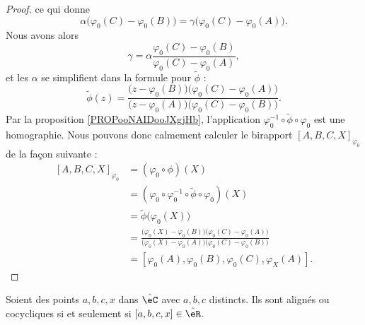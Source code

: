 \begin{proof}
    ce qui donne
    \begin{equation}
        \alpha\big( \varphi_0(C)-\varphi_0(B) \big)=\gamma\big( \varphi_0(C)-\varphi_0(A) \big).
    \end{equation}
    Nous avons alors
    \begin{equation}
        \gamma=\alpha\frac{ \varphi_0(C)-\varphi_0(B) }{ \varphi_0(C)-\varphi_0(A) },
    \end{equation}
    et les \( \alpha\) se simplifient dans la formule pour \( \tilde \phi\) :
    \begin{equation}
        \tilde \phi(z)=\frac{ \big( z- \varphi_0(B)   \big)\big( \varphi_0(C)-\varphi_0(A) \big) }{ \big( z-\varphi_0(A)\big)\big( \varphi_0(C)-\varphi_0(B) \big) }.
    \end{equation}
    Par la proposition \ref{PROPooNAIDooJXgjHb}, l'application \( \varphi_0^{-1}\circ\tilde \phi\circ\varphi_0\) est une homographie. Nous pouvons donc calmement calculer le birapport \( [A,B,C,X]_{\varphi_0}\) de la façon suivante :
    \begin{subequations}
        \begin{align}
            [A,B,C,X]_{\varphi_0}&=(\varphi_0\circ\phi)(X)\\
            &=(\varphi_0\circ\varphi_0^{-1}\circ\tilde \phi\circ\varphi_0)(X)\\
            &=\tilde \phi\big( \varphi_0(X) \big)\\
            &=\frac{ \big( \varphi_0(X)-\varphi_0(B) \big)\big( \varphi_0(C)-\varphi_0(A) \big) }{ \big( \varphi_0(X)-\varphi_0(A) \big)\big( \varphi_0(C)-\varphi_0(B) \big) }\\
            &=[\varphi_0(A),\varphi_0(B),\varphi_0(C),\varphi_X(A)].
        \end{align}
    \end{subequations}
\end{proof}

\begin{proposition}     \label{PROPooSGCJooLnOLCx}
    Soient des points \( a,b,c,x\) dans \( \hat\eC\) avec \( a,b,c\) distincts. Ils sont alignés ou cocycliques si et seulement si \( [a,b,c,x]\in \hat\eR\).
\end{proposition}

